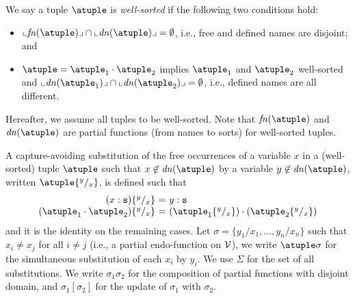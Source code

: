 We say a tuple $\atuple$ is {\em well-sorted} if the following two
conditions hold:
\begin{itemize}
\item
  $\supp{\fn\atuple} \cap \supp{\dn{\atuple}} = \emptyset$, i.e., free and
  defined names are disjoint; and
\item
  $\atuple = \atuple_1 \cdot \atuple_2$ implies $\atuple_1$ and
  $\atuple_2$ well-sorted and $\supp{\dn{\atuple_1}} \cap \supp{\dn{\atuple_2}} =
  \emptyset$, i.e., defined names are all different.
\end{itemize}
%
Hereafter, we assume all tuples to be well-sorted.
%
Note that $\fn{\atuple}$ and $\dn{\atuple}$ are partial functions (from names to sorts)
for well-sorted tuples.

A capture-avoiding
substitution of the free occurrences of a variable
$x$ in a (well-sorted) tuple $\atuple$ such that $x\not\in \dn{\atuple}$
 by a variable $y\not\in \dn{\atuple}$, written
$\atuple \sust x y$, is defined such that
%
\[
\begin{array}{r@{}l@{\ = \ } ll}
(x  : \asort)
&
\sust x y  
&  
y : \asort
\\
(\atuple_1 \cdot \atuple_2)
&
\sust x y  
& 
(\atuple_1\sust x y) \cdot (\atuple_2\sust x y) 
\end{array}
\]
%
and it is the identity on the remaining cases. Let
$\sigma = \{y_1/x_1,\ldots,y_n/x_n\}$ such that $x_i\neq x_j$ for all
$i\neq j$ (i.e., a partial endo-function on $\mathcal{V}$), we write
$\atuple\sigma$ for the simultaneous substitution of each $x_i$ by
$y_i$.
%
We use $\Sigma$ for the set of all substitutions. We write
$\sigma_1\sigma_2$ for the composition of partial functions with
disjoint domain, and $\sigma_1[\sigma_2]$ for the update of $\sigma_1$
with $\sigma_2$.


